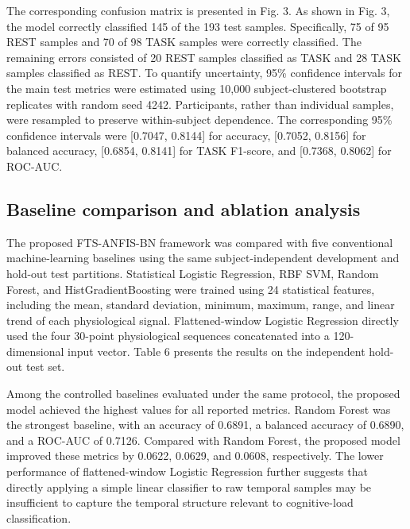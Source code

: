 \documentclass[runningheads]{llncs}
\begin{document}
The corresponding confusion matrix is presented in Fig. 3. As shown in Fig. 3, the model correctly classified 145 of the 193 test samples. Specifically, 75 of 95 REST samples and 70 of 98 TASK samples were correctly classified. The remaining errors consisted of 20 REST samples classified as TASK and 28 TASK samples classified as REST. To quantify uncertainty, 95\% confidence intervals for the main test metrics were estimated using 10,000 subject-clustered bootstrap replicates with random seed 4242. Participants, rather than individual samples, were resampled to preserve within-subject dependence. The corresponding 95\% confidence intervals were [0.7047, 0.8144] for accuracy, [0.7052, 0.8156] for balanced accuracy, [0.6854, 0.8141] for TASK F1-score, and [0.7368, 0.8062] for ROC-AUC.

\subsection{Baseline comparison and ablation analysis}

The proposed FTS-ANFIS-BN framework was compared with five conventional machine-learning baselines using the same subject-independent development and hold-out test partitions. Statistical Logistic Regression, RBF SVM, Random Forest, and HistGradientBoosting were trained using 24 statistical features, including the mean, standard deviation, minimum, maximum, range, and linear trend of each physiological signal. Flattened-window Logistic Regression directly used the four 30-point physiological sequences concatenated into a 120-dimensional input vector. Table 6 presents the results on the independent hold-out test set.

Among the controlled baselines evaluated under the same protocol, the proposed model achieved the highest values for all reported metrics. Random Forest was the strongest baseline, with an accuracy of 0.6891, a balanced accuracy of 0.6890, and a ROC-AUC of 0.7126. Compared with Random Forest, the proposed model improved these metrics by 0.0622, 0.0629, and 0.0608, respectively. The lower performance of flattened-window Logistic Regression further suggests that directly applying a simple linear classifier to raw temporal samples may be insufficient to capture the temporal structure relevant to cognitive-load classification.
\end{document}
